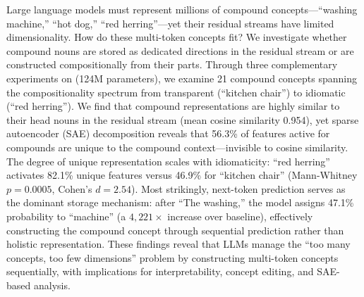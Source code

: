 Large language models must represent millions of compound concepts---``washing machine,'' ``hot dog,'' ``red herring''---yet their residual streams have limited dimensionality.
How do these multi-token concepts fit?
We investigate whether compound nouns are stored as dedicated directions in the residual stream or are constructed compositionally from their parts.
Through three complementary experiments on \gpttwo (124M parameters), we examine 21 compound concepts spanning the compositionality spectrum from transparent (``kitchen chair'') to idiomatic (``red herring'').
We find that compound representations are highly similar to their head nouns in the residual stream (mean cosine similarity 0.954), yet sparse autoencoder (SAE) decomposition reveals that 56.3\% of features active for compounds are unique to the compound context---invisible to cosine similarity.
The degree of unique representation scales with idiomaticity: ``red herring'' activates 82.1\% unique features versus 46.9\% for ``kitchen chair'' (Mann-Whitney $p = 0.0005$, Cohen's $d = 2.54$).
Most strikingly, next-token prediction serves as the dominant storage mechanism: after ``The washing,'' the model assigns 47.1\% probability to ``machine'' (a $4{,}221\times$ increase over baseline), effectively constructing the compound concept through sequential prediction rather than holistic representation.
These findings reveal that LLMs manage the ``too many concepts, too few dimensions'' problem by constructing multi-token concepts sequentially, with implications for interpretability, concept editing, and SAE-based analysis.
